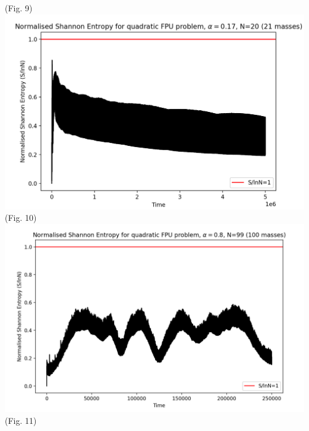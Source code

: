 \documentclass{article}
\begin{document}
\begin{center}
    (Fig. 9)\\
    \includegraphics[scale=.5]{SEN20LT.png}\\ 
    (Fig. 10)\\
    \includegraphics[scale=.45]{SEN100.png}\\ 
    (Fig. 11)
\end{center} 
\end{document}
